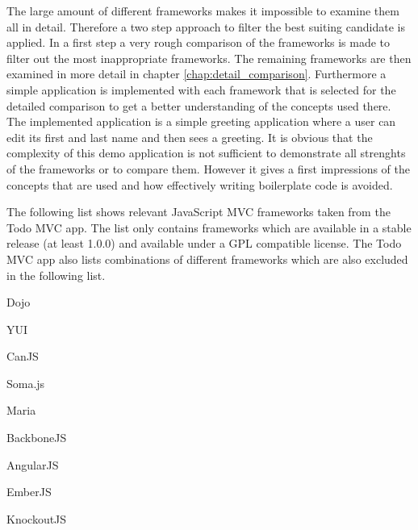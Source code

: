 The large amount of different frameworks makes it impossible to examine them all in detail.
Therefore a two step approach to filter the best suiting candidate is applied.
In a first step a very rough comparison of the frameworks is made to filter out the most inappropriate frameworks.
The remaining frameworks are then examined in more detail in chapter \ref{chap:detail_comparison}.
Furthermore a simple application is implemented with each framework that is selected for the detailed comparison to get a better understanding of the concepts used there.
The implemented application is a simple greeting application where a user can edit its first and last name and then sees a greeting. 
It is obvious that the complexity of this demo application is not sufficient to demonstrate all strenghts of the frameworks or to compare them. However it gives a first impressions of the concepts that are used and how effectively writing boilerplate code is avoided.

   
The following list shows relevant JavaScript MVC frameworks taken from the Todo MVC app.
The list only contains frameworks which are available in a stable release (at least 1.0.0) and available under a GPL compatible license.
The Todo MVC app also lists combinations of different frameworks which are also excluded in the following list.\\

\begin{itemize}
\begin{minipage}{0.5\textwidth}

	\item Dojo
	\item YUI
	\item CanJS
	\item Soma.js
	\item Maria
\end{minipage}
\begin{minipage}{0.5\textwidth}

	\item BackboneJS
	\item AngularJS
	\item EmberJS
	\item KnockoutJS
	\end{minipage}
\end{itemize}
\\

